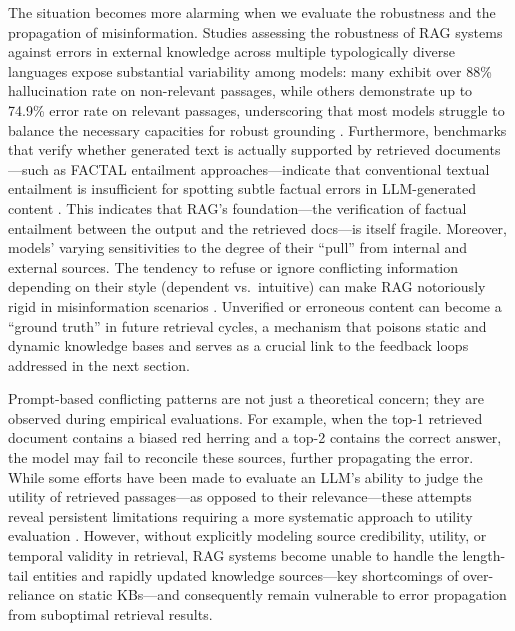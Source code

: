 \documentclass[11pt]{article}
\begin{document}
The situation becomes more alarming when we evaluate the robustness and the propagation of misinformation. Studies assessing the robustness of RAG systems against errors in external knowledge across multiple typologically diverse languages expose substantial variability among models: many exhibit over 88\% hallucination rate on non-relevant passages, while others demonstrate up to 74.9\% error rate on relevant passages, underscoring that most models struggle to balance the necessary capacities for robust grounding \cite{ref125}. Furthermore, benchmarks that verify whether generated text is actually supported by retrieved documents---such as FACTAL entailment approaches---indicate that conventional textual entailment is insufficient for spotting subtle factual errors in LLM-generated content \cite{ref146}. This indicates that RAG's foundation---the verification of factual entailment between the output and the retrieved docs---is itself fragile. Moreover, models' varying sensitivities to the degree of their ``pull'' from internal and external sources. The tendency to refuse or ignore conflicting information depending on their style (dependent vs.~intuitive) can make RAG notoriously rigid in misinformation scenarios \cite{ref248}. Unverified or erroneous content can become a ``ground truth'' in future retrieval cycles, a mechanism that poisons static and dynamic knowledge bases and serves as a crucial link to the feedback loops addressed in the next section.

Prompt-based conflicting patterns are not just a theoretical concern; they are observed during empirical evaluations. For example, when the top-1 retrieved document contains a biased red herring and a top-2 contains the correct answer, the model may fail to reconcile these sources, further propagating the error. While some efforts have been made to evaluate an LLM's ability to judge the utility of retrieved passages---as opposed to their relevance---these attempts reveal persistent limitations requiring a more systematic approach to utility evaluation \cite{ref53}. However, without explicitly modeling source credibility, utility, or temporal validity in retrieval, RAG systems become unable to handle the length-tail entities and rapidly updated knowledge sources---key shortcomings of over-reliance on static KBs---and consequently remain vulnerable to error propagation from suboptimal retrieval results.
\end{document}
